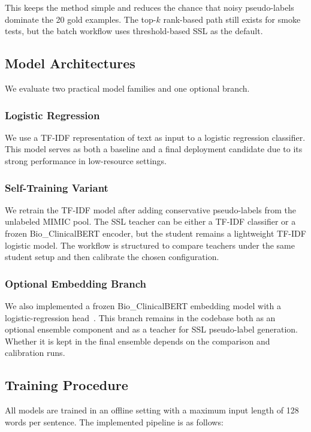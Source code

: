 \documentclass[journal]{IEEEtran}
\begin{document}
This keeps the method simple and reduces the chance that noisy pseudo-labels dominate the 20 gold examples. The top-$k$ rank-based path still exists for smoke tests, but the batch workflow uses threshold-based SSL as the default.

\subsection{Model Architectures}

We evaluate two practical model families and one optional branch.

\subsubsection{Logistic Regression}
We use a TF-IDF representation of text as input to a logistic regression classifier. This model serves as both a baseline and a final deployment candidate due to its strong performance in low-resource settings.

\subsubsection{Self-Training Variant}
We retrain the TF-IDF model after adding conservative pseudo-labels from the unlabeled MIMIC pool. The SSL teacher can be either a TF-IDF classifier or a frozen Bio\_ClinicalBERT encoder, but the student remains a lightweight TF-IDF logistic model. The workflow is structured to compare teachers under the same student setup and then calibrate the chosen configuration.

\subsubsection{Optional Embedding Branch}
We also implemented a frozen Bio\_ClinicalBERT embedding model with a logistic-regression head~\cite{clinicalbert}. This branch remains in the codebase both as an optional ensemble component and as a teacher for SSL pseudo-label generation. Whether it is kept in the final ensemble depends on the comparison and calibration runs.

\subsection{Training Procedure}

All models are trained in an offline setting with a maximum input length of 128 words per sentence. The implemented pipeline is as follows:
\end{document}
